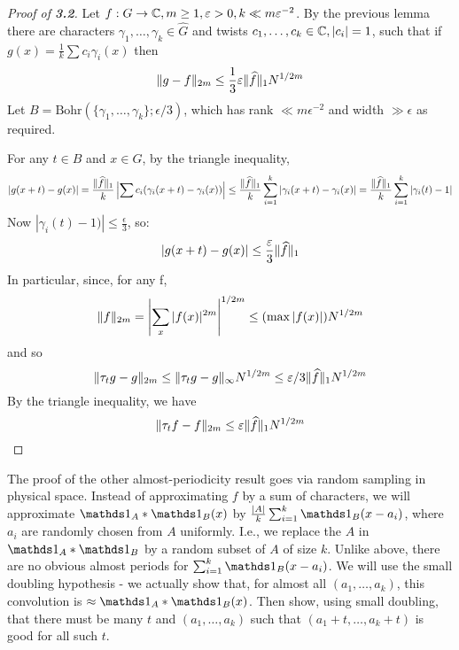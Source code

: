\documentclass[10pt,a4paper]{article}
\begin{document}
\begin{proof}[Proof of \textbf{3.2}]
  Let $f:G \to \mathbb{C}, m \geq 1, \varepsilon > 0, k \ll m\varepsilon^{-2}$. By the previous lemma there are characters $\gamma_1, \ldots, \gamma_k \in \hat{G}$ and twists $c_1, \ldots, c_k \in \mathbb{C}, |c_i| = 1$, such that if $g(x) = \frac{1}{k}\sum c_i \gamma_i(x)$ then
  \[\lVert g-f\rVert_{2m} \leq \frac{1}{3}\varepsilon \lVert\widehat{f}\rVert_1 N^{1/2m}\]
  Let $B = \text{Bohr}(\{\gamma_1, \ldots, \gamma_k\}; \epsilon/3)$, which has rank $\ll m\epsilon^{-2}$ and width $\gg \epsilon$ as required.

  For any $t \in B$ and $x \in G$, by the triangle inequality,
  \[|g(x+t) - g(x)| = \frac{\lVert\widehat{f}\rVert_1}{k}\left| \sum c_i(\gamma_i(x+t)-\gamma_i(x))\right| \leq \frac{\lVert\widehat{f}\rVert_1}{k}\sum_{i=1}^k |\gamma_i(x+t)-\gamma_i(x)| = \frac{\lVert\widehat{f}\rVert_1}{k}\sum_{i=1}^k |\gamma_i(t)-1|\]
  Now $|\gamma_i(t)-1)| \leq \frac{\epsilon}{3}$, so:
  \[|g(x+t)-g(x)| \leq \frac{\varepsilon}{3}\lVert\widehat{f}\rVert_1\]
  In particular, since, for any f,
  \[\lVert f\rVert_{2m} = \left|\sum_x |f(x)|^{2m}\right|^{1/2m} \leq (\max |f(x)|)N^{1/2m}\]
  and so
  \[\lVert\tau_t g-g\rVert_{2m} \leq \lVert\tau_t g-g\rVert_{\infty} N^{1/2m} \leq \varepsilon/3 \lVert\widehat{f}\rVert_1 N^{1/2m}\]
  By the triangle inequality, we have
  \[\lVert\tau_t f-f\rVert_{2m} \leq \varepsilon \lVert\widehat{f}\rVert_1 N^{1/2m}\]
\end{proof}
The proof of the other almost-periodicity result goes via random sampling in physical space. Instead of approximating $f$ by a sum of characters, we will approximate $\one_A\ast \one_B(x)$ by $\frac{|A|}{k}\sum_{i=1}^k \one_B(x-a_i)$, where $a_i$ are randomly chosen from $A$ uniformly. I.e., we replace the $A$ in $\one_A \ast \one_B$ by a random subset of $A$ of size $k$. Unlike above, there are no obvious almost periods for $\sum_{i=1}^k \one_B(x-a_i)$. We will use the small doubling hypothesis - we actually show that, for almost all $(a_1, \ldots, a_k)$, this convolution is $\approx \one_A \ast \one_B(x)$. Then show, using small doubling, that there must be many $t$ and $(a_1, \ldots, a_k)$ such that $(a_1+t, \ldots, a_k+t)$ is good for all such $t$.
\end{document}
